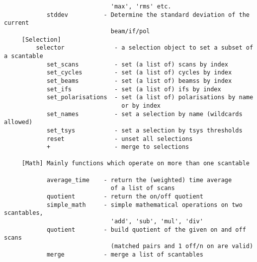 \documentclass[11pt]{article}
\begin{document}
\begin{verbatim}
                              'max', 'rms' etc.
            stddev          - Determine the standard deviation of the current
                              beam/if/pol
     [Selection]
         selector              - a selection object to set a subset of a scantable
            set_scans          - set (a list of) scans by index
            set_cycles         - set (a list of) cycles by index
            set_beams          - set (a list of) beamss by index
            set_ifs            - set (a list of) ifs by index
            set_polarisations  - set (a list of) polarisations by name
                                 or by index
            set_names          - set a selection by name (wildcards allowed)
            set_tsys           - set a selection by tsys thresholds
            reset              - unset all selections
            +                  - merge to selections

     [Math] Mainly functions which operate on more than one scantable

            average_time    - return the (weighted) time average
                              of a list of scans
            quotient        - return the on/off quotient
            simple_math     - simple mathematical operations on two scantables,
                              'add', 'sub', 'mul', 'div'
            quotient        - build quotient of the given on and off scans
                              (matched pairs and 1 off/n on are valid)
            merge           - merge a list of scantables


\end{verbatim}
\end{document}
